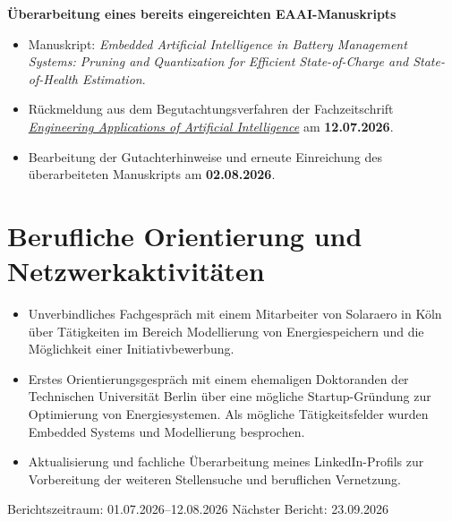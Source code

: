 \documentclass[10pt,a4paper]{scrartcl}
\begin{document}
\textbf{Überarbeitung eines bereits eingereichten EAAI-Manuskripts}
\begin{itemize}
    \item Manuskript: \emph{Embedded Artificial Intelligence in Battery Management Systems: Pruning and Quantization for Efficient State-of-Charge and State-of-Health Estimation}.
    \item Rückmeldung aus dem Begutachtungsverfahren der Fachzeitschrift \href{https://www.sciencedirect.com/journal/engineering-applications-of-artificial-intelligence}{\emph{Engineering Applications of Artificial Intelligence}} am \textbf{12.07.2026}.
    \item Bearbeitung der Gutachterhinweise und erneute Einreichung des überarbeiteten Manuskripts am \textbf{02.08.2026}.
\end{itemize}

\section*{Berufliche Orientierung und Netzwerkaktivitäten}
\begin{itemize}
    \item Unverbindliches Fachgespräch mit einem Mitarbeiter von Solaraero in Köln über Tätigkeiten im Bereich Modellierung von Energiespeichern und die Möglichkeit einer Initiativbewerbung.
    \item Erstes Orientierungsgespräch mit einem ehemaligen Doktoranden der Technischen Universität Berlin über eine mögliche Startup-Gründung zur Optimierung von Energiesystemen. Als mögliche Tätigkeitsfelder wurden Embedded Systems und Modellierung besprochen.
    \item Aktualisierung und fachliche Überarbeitung meines LinkedIn-Profils zur Vorbereitung der weiteren Stellensuche und beruflichen Vernetzung.
\end{itemize}

\vfill
{\small\color{textgray}Berichtszeitraum: 01.07.2026--12.08.2026 \hfill Nächster Bericht: 23.09.2026}
\end{document}
